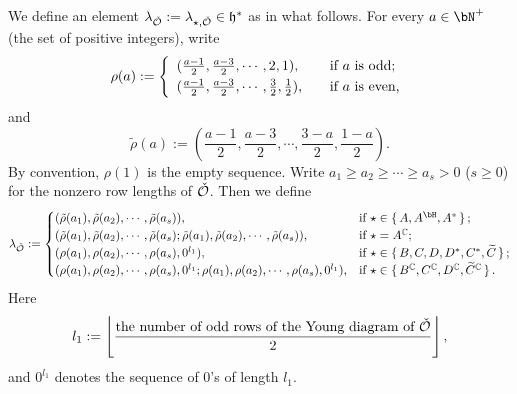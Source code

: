 \documentclass[counting_main.tex]{subfiles}
\begin{document}
We define an element  $\lambda_{\check {{\mathcal {O}}}}:=\lambda_{\star, \check {{\mathcal {O}}}} \in \mathfrak h^*$  as in what follows.
For every  $a\in \bN^+$ (the set of positive integers), write
\[
  \rho(a):=\left\{ \begin{array}{ll}
                  (\frac{a-1}{2}, \frac{a-3}{2}, \cdots, 2,1), \quad &\textrm{if $a$ is odd;}\smallskip\\
                    (\frac{a-1}{2}, \frac{a-3}{2}, \cdots, \frac{3}{2}, \frac{1}{2}), \quad &\textrm{if $a$ is even,}\\
                    \end{array}
                 \right.
\]
and
\[
   \tilde \rho(a):=
                  (\frac{a-1}{2}, \frac{a-3}{2}, \cdots, \frac{3-a}{2},\frac{1-a}{2}).
\]
By convention, $\rho(1)$ is the empty sequence. Write $a_1\geq  a_2\geq \cdots\geq a_s>0$ ($s\geq 0$)  for the nonzero row lengths of  $\check {{\mathcal {O}}}$. Then we define
\[
  \lambda_{\check \CO}:= \begin{cases}
 (\tilde \rho( a_1), \tilde \rho(a_2),  \cdots, \tilde \rho(a_s)), & \text{if } \star \in \set{A, A^\bH, A^*};\\
  (\tilde \rho( a_1), \tilde \rho(a_2),  \cdots, \tilde \rho(a_s); \tilde \rho( a_1), \tilde \rho(a_2),  \cdots, \tilde \rho(a_s)), & \text{if } \star =A^\C;\\
  (\rho( a_1), \rho(a_2),  \cdots, \rho(a_s), 0^{l_1} ) , & \text{if } \star \in \set{B, C, D, D^*, C^*,\widetilde C};\\
(\rho( a_1), \rho(a_2),  \cdots, \rho(a_s), 0^{l_1} ;  \rho( a_1), \rho(a_2),  \cdots, \rho(a_s), 0^{l_1} ) , & \text{if } \star \in \set{B^\C, C^\C, D^\C, \widetilde C^\C}.\\
   \end{cases}
\]
Here
\[
l_1:= \left\lfloor\frac{\textrm{the number of odd rows of the Young diagram of $\check {{\mathcal {O}}}$}}{2}\right\rfloor,
\]
and $0^{l_1}$ denotes the sequence of $0$'s of length $l_1$.
\end{document}
